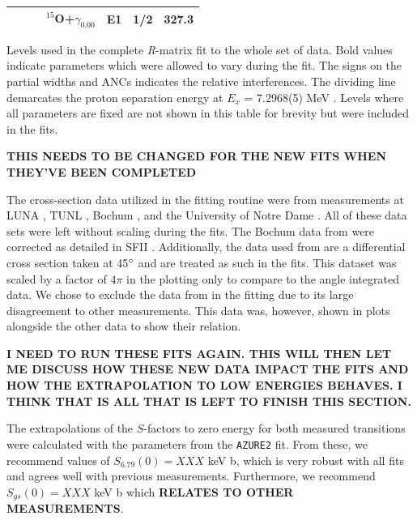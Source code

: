 \begin{table}[]
\begin{center}
\begin{threeparttable}
\begin{tabular}{c  c  c  c  c  c  c}
	&	&	&	$^{15}$O+$\gamma_{0.00}$	&	E1	&	1/2	&	\textbf{327.3}	\\
\bottomrule
\end{tabular}
\begin{tablenotes}
\small 
\item Levels used in the complete \textit{R}-matrix fit to the whole set of data. Bold values indicate parameters which were allowed to vary during the fit. The signs on the partial widths and ANCs indicates the relative interferences. The dividing line demarcates the proton separation energy at $E_x$ = 7.2968(5) MeV \cite{Ajzenberg-Selove1991}. Levels where all parameters are fixed are not shown in this table for brevity but were included in the fits.
\item \textbf{THIS NEEDS TO BE CHANGED FOR THE NEW FITS WHEN THEY'VE BEEN COMPLETED}
\end{tablenotes}
\end{threeparttable}
\label{table: fitParamsFullFit}
\end{center}
\end{table}  



The cross-section data utilized in the fitting routine were from measurements at LUNA \cite{Formicola2004, Imbriani2005, Marta2008, Marta2011}, TUNL \cite{Runkle2005}, Bochum \cite{Schroder1987}, and the University of Notre Dame \cite{Li2016}. All of these data sets were left without scaling during the fits. The Bochum data from \citet{Schroder1987} were corrected as detailed in SFII \cite{Adelberger2011}. Additionally, the data used from \citet{Li2016} are a differential cross section taken at 45$\degree$ and are treated as such in the fits. This dataset was scaled by a factor of 4$\pi$ in the plotting only to compare to the angle integrated data. We chose to exclude the data from \citet{Wagner2018} in the fitting due to its large disagreement to other measurements. This data was, however, shown in plots alongside the other data to show their relation.


\textbf{I NEED TO RUN THESE FITS AGAIN. THIS WILL THEN LET ME DISCUSS HOW THESE NEW DATA IMPACT THE FITS AND HOW THE EXTRAPOLATION TO LOW ENERGIES BEHAVES. I THINK THAT IS ALL THAT IS LEFT TO FINISH THIS SECTION.}

The extrapolations of the $S$-factors to zero energy for both measured transitions were calculated with the parameters from the \texttt{AZURE2} fit. From these, we recommend values of $S_{6.79}(0) = XXX$ keV b, which is very robust with all fits and agrees well with previous measurements. Furthermore, we recommend $S_{gs}(0) = XXX$ keV b which \textbf{RELATES TO OTHER MEASUREMENTS}. 


%
% 
% 
